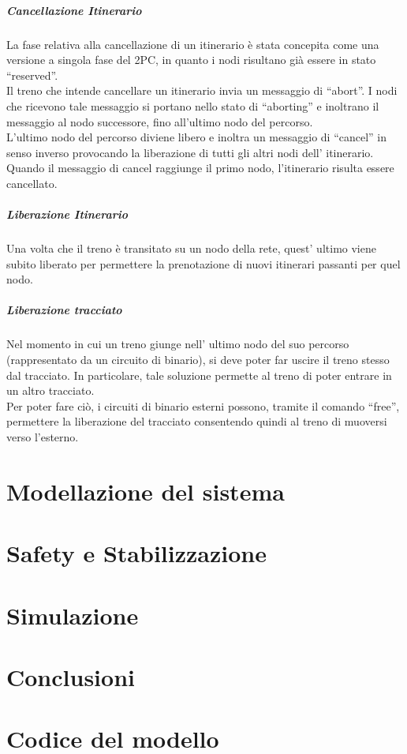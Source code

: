 \documentclass[10pt,a4paper,oneside]{report}
\begin{document}
\paragraph*{Cancellazione Itinerario}
La fase relativa alla cancellazione di un itinerario è stata concepita come una versione a singola fase del 2PC, in quanto i nodi risultano già essere in stato ``reserved''.\\
Il treno che intende cancellare un itinerario invia un messaggio di ``abort''. I nodi che ricevono tale messaggio si portano nello stato di ``aborting'' e inoltrano il messaggio al nodo successore, fino all'ultimo nodo del percorso.\\
L'ultimo nodo del percorso diviene libero e inoltra un messaggio di ``cancel'' in senso inverso provocando la liberazione di tutti gli altri nodi dell' itinerario. Quando il messaggio di cancel raggiunge il primo nodo, l'itinerario risulta essere cancellato.

\paragraph*{Liberazione Itinerario}
Una volta che il treno è transitato su un nodo della rete, quest' ultimo viene subito liberato per permettere la prenotazione di nuovi itinerari passanti per quel nodo.\\
\paragraph*{Liberazione tracciato}
Nel momento in cui un treno giunge nell' ultimo nodo del suo percorso (rappresentato da un circuito di binario), si deve poter far uscire il treno stesso dal tracciato.
In particolare, tale soluzione permette al treno di poter entrare in un altro tracciato.\\
Per poter fare ciò, i circuiti di binario esterni possono, tramite il comando ``free'', permettere la liberazione del tracciato consentendo quindi al treno di muoversi verso l'esterno.



\chapter{Modellazione del sistema}

\chapter{Safety e Stabilizzazione}

\chapter{Simulazione}

\chapter{Conclusioni}
\appendix


\chapter{Codice del modello}
\end{document}
